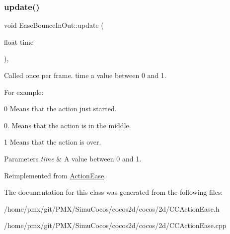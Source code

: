 \mbox{\label{classEaseBounceInOut_abd929d5112158561a9d793a46cc51fc1}} 
\subsubsection{\texorpdfstring{update()}{update()}}
{\footnotesize\ttfamily void Ease\+Bounce\+In\+Out\+::update (\begin{DoxyParamCaption}\item[{float}]{time }\end{DoxyParamCaption})\hspace{0.3cm}{\ttfamily [override]}, {\ttfamily [virtual]}}

Called once per frame. time a value between 0 and 1.

For example\+:
\begin{DoxyItemize}
\item 0 Means that the action just started.
\item 0. Means that the action is in the middle.
\item 1 Means that the action is over.
\end{DoxyItemize}


\begin{DoxyParams}{Parameters}
{\em time} & A value between 0 and 1. \\
\hline
\end{DoxyParams}


Reimplemented from \hyperlink{classActionEase_a77679f09c02cf75fb54776470c339fc5}{Action\+Ease}.



The documentation for this class was generated from the following files\+:\begin{DoxyCompactItemize}
\item 
/home/pmx/git/\+P\+M\+X/\+Simu\+Cocos/cocos2d/cocos/2d/C\+C\+Action\+Ease.\+h\item 
/home/pmx/git/\+P\+M\+X/\+Simu\+Cocos/cocos2d/cocos/2d/C\+C\+Action\+Ease.\+cpp\end{DoxyCompactItemize}
